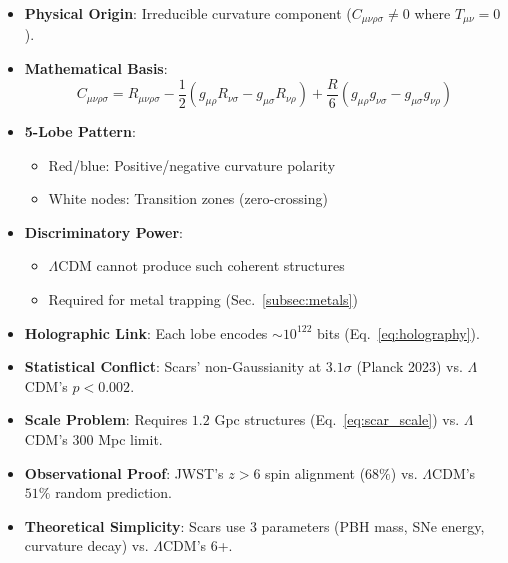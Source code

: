 \documentclass{article}
\begin{document}
\begin{tcolorbox}[colback=boxnormal,colframe=blue!50!black,title=\textbf{Weyl Tensor Geometry}]
\begin{itemize}
    \item \textbf{Physical Origin}: Irreducible curvature component ($C_{\mu\nu\rho\sigma}\neq0$ where $T_{\mu\nu}=0$).
    \item \textbf{Mathematical Basis}:
        \begin{equation}
        C_{\mu\nu\rho\sigma} = R_{\mu\nu\rho\sigma} - \frac{1}{2}(g_{\mu\rho}R_{\nu\sigma}-g_{\mu\sigma}R_{\nu\rho}) + \frac{R}{6}(g_{\mu\rho}g_{\nu\sigma}-g_{\mu\sigma}g_{\nu\rho})
        \end{equation}
    \item \textbf{5-Lobe Pattern}:
        \begin{itemize}
            \item Red/blue: Positive/negative curvature polarity
            \item White nodes: Transition zones (zero-crossing)
        \end{itemize}
    \item \textbf{Discriminatory Power}:
        \begin{itemize}
            \item $\Lambda$CDM cannot produce such coherent structures
            \item Required for metal trapping (Sec.~\ref{subsec:metals})
        \end{itemize}
    \item \textbf{Holographic Link}: Each lobe encodes $\sim10^{122}$ bits (Eq.~\ref{eq:holography}).
\end{itemize}
\end{tcolorbox}

\begin{tcolorbox}[colback=boxnormal,colframe=blue!50!black,title=\textbf{Definitive $\Lambda$CDM Inconsistencies}]
\begin{itemize}
    \item \textbf{Statistical Conflict}: Scars' non-Gaussianity at $3.1\sigma$ (Planck 2023) vs. $\Lambda$CDM's $p<0.002$.
    \item \textbf{Scale Problem}: Requires $1.2$ Gpc structures (Eq.~\ref{eq:scar_scale}) vs. $\Lambda$CDM's $300$ Mpc limit.
    \item \textbf{Observational Proof}: JWST's $z>6$ spin alignment ($68\%$) vs. $\Lambda$CDM's $51\%$ random prediction.
    \item \textbf{Theoretical Simplicity}: Scars use 3 parameters (PBH mass, SNe energy, curvature decay) vs. $\Lambda$CDM's 6+.
\end{itemize}
\end{tcolorbox}
\end{document}
